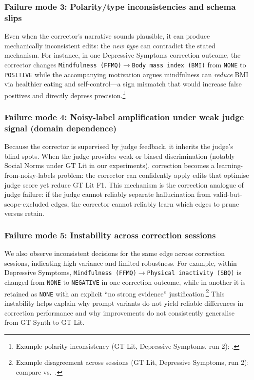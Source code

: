 \subsubsection{Failure mode 3: Polarity/type inconsistencies and schema slips}
Even when the corrector's narrative sounds plausible, it can produce mechanically inconsistent edits: the \emph{new type} can contradict the stated mechanism. For instance, in one Depressive Symptoms correction outcome, the corrector changes \texttt{Mindfulness (FFMQ)}$\rightarrow$\texttt{Body mass index (BMI)} from \texttt{NONE} to \texttt{POSITIVE} while the accompanying motivation argues mindfulness can \emph{reduce} BMI via healthier eating and self-control---a sign mismatch that would increase false positives and directly depress precision.\footnote{Example polarity inconsistency (GT Lit, Depressive Symptoms, run 2): .}%

\subsubsection{Failure mode 4: Noisy-label amplification under weak judge signal (domain dependence)}
Because the corrector is supervised by judge feedback, it inherits the judge's blind spots. When the judge provides weak or biased discrimination (notably Social Norms under GT Lit in our experiments), correction becomes a learning-from-noisy-labels problem: the corrector can confidently apply edits that optimise judge score yet reduce GT Lit F1. This mechanism is the correction analogue of judge failure: if the judge cannot reliably separate hallucination from valid-but-scope-excluded edges, the corrector cannot reliably learn which edges to prune versus retain.

\subsubsection{Failure mode 5: Instability across correction sessions}
We also observe inconsistent decisions for the same edge across correction sessions, indicating high variance and limited robustness. For example, within Depressive Symptoms, \texttt{Mindfulness (FFMQ)}$\rightarrow$\texttt{Physical inactivity (SBQ)} is changed from \texttt{NONE} to \texttt{NEGATIVE} in one correction outcome, while in another it is retained as \texttt{NONE} with an explicit ``no strong evidence'' justification.\footnote{Example disagreement across sessions (GT Lit, Depressive Symptoms, run 2): compare  vs.\ .}%
This instability helps explain why prompt variants do not yield reliable differences in correction performance and why improvements do not consistently generalise from GT Synth to GT Lit.

